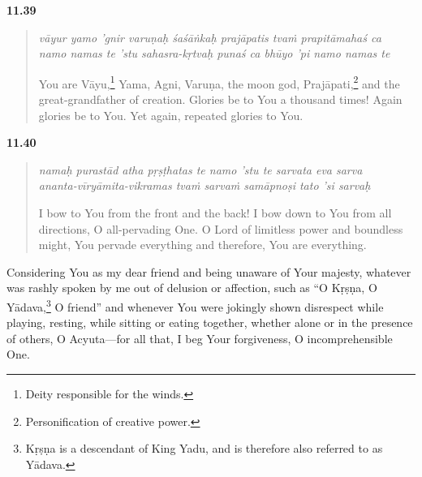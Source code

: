 \par\noindent\textbf{11.39}\par
\begin{verse}
\textit{vāyur yamo ’gnir varuṇaḥ śaśāṅkaḥ prajāpatis tvaṁ prapitāmahaś ca} \\
\textit{namo namas te ’stu sahasra-kṛtvaḥ punaś ca bhūyo ’pi namo namas te}

\noindent You are Vāyu,\footnote{Deity responsible for the winds.} Yama, Agni, Varuṇa, the moon god, Prajāpati,\footnote{Personification of creative power.} and the great-grandfather of creation. Glories be to You a thousand times! Again glories be to You. Yet again, repeated glories to You.
\end{verse}
\par



\par\noindent\textbf{11.40}\par
\begin{verse}
\textit{namaḥ purastād atha pṛṣṭhatas te namo ’stu te sarvata eva sarva} \\
\textit{ananta-vīryāmita-vikramas tvaṁ sarvaṁ samāpnoṣi tato ’si sarvaḥ}

\noindent I bow to You from the front and the back! I bow down to You from all directions, O all-pervading One. O Lord of limitless power and boundless might, You pervade everything and therefore, You are everything.
\end{verse}
\par


{Considering You as my dear friend and being unaware of Your majesty, whatever was rashly spoken by me out of delusion or affection, such as \enquote{O Kṛṣṇa, O Yādava,\footnote{Kṛṣṇa is a descendant of King Yadu, and is therefore also referred to as Yādava.} O friend}  and whenever You were jokingly shown disrespect while playing, resting, while sitting or eating together, whether alone or in the presence of others, O Acyuta---for all that, I beg Your forgiveness, O incomprehensible One.}


